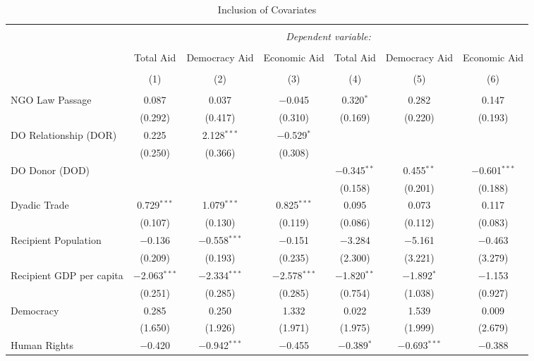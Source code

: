 
\begin{table}[!htbp] \centering 
  \caption{Inclusion of Covariates} 
  \label{tab:me} 
\footnotesize 
\begin{tabular}{@{\extracolsep{5pt}}lcccccc} 
\\[-1.8ex]\hline 
\hline \\[-1.8ex] 
 & \multicolumn{6}{c}{\textit{Dependent variable:}} \\ 
\cline{2-7} 
\\[-1.8ex] & Total Aid & Democracy Aid & Economic Aid & Total Aid & Democracy Aid & Economic Aid \\ 
\\[-1.8ex] & (1) & (2) & (3) & (4) & (5) & (6)\\ 
\hline \\[-1.8ex] 
 NGO Law Passage & 0.087 & 0.037 & $-$0.045 & 0.320$^{*}$ & 0.282 & 0.147 \\ 
  & (0.292) & (0.417) & (0.310) & (0.169) & (0.220) & (0.193) \\ 
  DO Relationship (DOR) & 0.225 & 2.128$^{***}$ & $-$0.529$^{*}$ &  &  &  \\ 
  & (0.250) & (0.366) & (0.308) &  &  &  \\ 
  DO Donor (DOD) &  &  &  & $-$0.345$^{**}$ & 0.455$^{**}$ & $-$0.601$^{***}$ \\ 
  &  &  &  & (0.158) & (0.201) & (0.188) \\ 
  Dyadic Trade & 0.729$^{***}$ & 1.079$^{***}$ & 0.825$^{***}$ & 0.095 & 0.073 & 0.117 \\ 
  & (0.107) & (0.130) & (0.119) & (0.086) & (0.112) & (0.083) \\ 
  Recipient Population & $-$0.136 & $-$0.558$^{***}$ & $-$0.151 & $-$3.284 & $-$5.161 & $-$0.463 \\ 
  & (0.209) & (0.193) & (0.235) & (2.300) & (3.221) & (3.279) \\ 
  Recipient GDP per capita & $-$2.063$^{***}$ & $-$2.334$^{***}$ & $-$2.578$^{***}$ & $-$1.820$^{**}$ & $-$1.892$^{*}$ & $-$1.153 \\ 
  & (0.251) & (0.285) & (0.285) & (0.754) & (1.038) & (0.927) \\ 
  Democracy & 0.285 & 0.250 & 1.332 & 0.022 & 1.539 & 0.009 \\ 
  & (1.650) & (1.926) & (1.971) & (1.975) & (1.999) & (2.679) \\ 
  Human Rights & $-$0.420 & $-$0.942$^{***}$ & $-$0.455 & $-$0.389$^{*}$ & $-$0.693$^{***}$ & $-$0.388 \\ 

\end{tabular}
\end{table}
